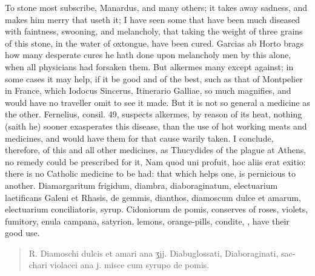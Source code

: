 To  stone most subscribe, Manardus, and many others; it
takes away sadness, and makes him merry that useth it; I have seen some
that have been much diseased with faintness, swooning, and melancholy,
that taking the weight of three grains of this stone, in the water of
oxtongue, have been cured. Garcias ab Horto brags how many desperate
cures he hath done upon melancholy men by this alone, when all
physicians had forsaken them. But alkermes many except against; in some
cases it may help, if it be good and of the best, such as that of
Montpelier in France, which Iodocus Sincerus, Itinerario Galliae,
so much magnifies, and would have no traveller omit to see it made. But
it is not so general a medicine as the other. Fernelius, consil. 49,
suspects alkermes, by reason of its heat, nothing (saith he)
sooner exasperates this disease, than the use of hot working meats and
medicines, and would have them for that cause warily taken. I conclude,
therefore, of this and all other medicines, as Thucydides of the plague
at Athens, no remedy could be prescribed for it, Nam quod uni profuit,
hoc aliis erat exitio: there is no Catholic medicine to be had: that
which helps one, is pernicious to another.
Diamargaritum frigidum, diambra, diaboraginatum, electuarium
laetificans Galeni et Rhasis, de gemmis, dianthos, diamoscum dulce et
amarum, electuarium conciliatoris, syrup. Cidoniorum de pomis,
conserves of roses, violets, fumitory, enula campana, satyrion, lemons,
orange-pills, condite, \etc{}, have their good use.

\begin{quote}
\begin{latin}
℞. Diamoschi dulcis et amari ana ʒjj. Diabuglossati,
Diaboraginati, sacchari violacei ana j. misce cum syrupo de pomis.
\end{latin}
\end{quote}

